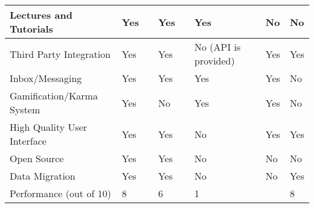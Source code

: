 \begin{table}[ht]
{\begin{tabular}{llllllll}
        \multicolumn{1}{|l|}{Lectures and Tutorials}      & \multicolumn{1}{l|}{Yes} & \multicolumn{1}{l|}{} & \multicolumn{1}{l|}{Yes} & \multicolumn{1}{l|}{} & \multicolumn{1}{l|}{Yes}                       & \multicolumn{1}{l|}{No} & \multicolumn{1}{l|}{No} \\ \hline
        \multicolumn{1}{|l|}{Third Party Integration}     & \multicolumn{1}{l|}{Yes} & \multicolumn{1}{l|}{} & \multicolumn{1}{l|}{Yes} & \multicolumn{1}{l|}{} & \multicolumn{1}{l|}{No (API is provided)}      & \multicolumn{1}{l|}{Yes} & \multicolumn{1}{l|}{Yes} \\ \hline
        \multicolumn{1}{|l|}{Inbox/Messaging}             & \multicolumn{1}{l|}{Yes} & \multicolumn{1}{l|}{} & \multicolumn{1}{l|}{Yes} & \multicolumn{1}{l|}{} & \multicolumn{1}{l|}{Yes}                       & \multicolumn{1}{l|}{Yes} & \multicolumn{1}{l|}{No} \\ \hline
        \multicolumn{1}{|l|}{Gamification/Karma System}   & \multicolumn{1}{l|}{Yes} & \multicolumn{1}{l|}{} & \multicolumn{1}{l|}{No} & \multicolumn{1}{l|}{} & \multicolumn{1}{l|}{Yes}                       & \multicolumn{1}{l|}{Yes} & \multicolumn{1}{l|}{No} \\ \hline
        \multicolumn{1}{|l|}{High Quality User Interface} & \multicolumn{1}{l|}{Yes} & \multicolumn{1}{l|}{} & \multicolumn{1}{l|}{Yes} & \multicolumn{1}{l|}{} & \multicolumn{1}{l|}{No}                        & \multicolumn{1}{l|}{Yes} & \multicolumn{1}{l|}{Yes} \\ \hline
        \multicolumn{1}{|l|}{Open Source}                 & \multicolumn{1}{l|}{Yes} & \multicolumn{1}{l|}{} & \multicolumn{1}{l|}{Yes} & \multicolumn{1}{l|}{} & \multicolumn{1}{l|}{No}                        & \multicolumn{1}{l|}{No} & \multicolumn{1}{l|}{No} \\ \hline
        \multicolumn{1}{|l|}{Data Migration}              & \multicolumn{1}{l|}{Yes} & \multicolumn{1}{l|}{} & \multicolumn{1}{l|}{Yes} & \multicolumn{1}{l|}{} & \multicolumn{1}{l|}{No}                        & \multicolumn{1}{l|}{No} & \multicolumn{1}{l|}{Yes} \\ \hline
        Performance (out of 10)                           & 8                      &                       & 6                      &                       & 1                                              &                       & 8                      \\ \hline
    \end{tabular}}
\end{table}







